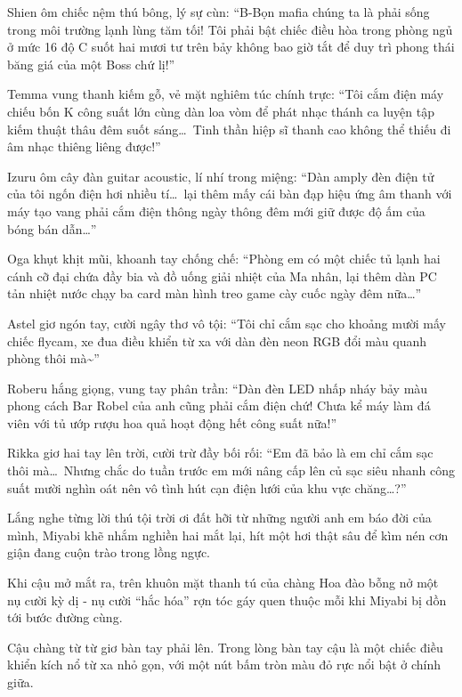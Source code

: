 \documentclass[../main.tex]{subfiles}
\begin{document}
Shien ôm chiếc nệm thú bông, lý sự cùn: ``B-Bọn mafia chúng ta là phải sống trong môi trường lạnh lùng tăm tối! Tôi phải bật chiếc điều hòa trong phòng ngủ ở mức 16 độ C suốt hai mươi tư trên bảy không bao giờ tắt để duy trì phong thái băng giá của một Boss chứ lị!''

Temma vung thanh kiếm gỗ, vẻ mặt nghiêm túc chính trực: ``Tôi cắm điện máy chiếu bốn K công suất lớn cùng dàn loa vòm để phát nhạc thánh ca luyện tập kiếm thuật thâu đêm suốt sáng\dots\ Tinh thần hiệp sĩ thanh cao không thể thiếu đi âm nhạc thiêng liêng được!''

Izuru ôm cây đàn guitar acoustic, lí nhí trong miệng: ``Dàn amply đèn điện tử của tôi ngốn điện hơi nhiều tí\dots\ lại thêm mấy cái bàn đạp hiệu ứng âm thanh với máy tạo vang phải cắm điện thông ngày thông đêm mới giữ được độ ấm của bóng bán dẫn\dots''

Oga khụt khịt mũi, khoanh tay chống chế: ``Phòng em có một chiếc tủ lạnh hai cánh cỡ đại chứa đầy bia và đồ uống giải nhiệt của Ma nhân, lại thêm dàn PC tản nhiệt nước chạy ba card màn hình treo game cày cuốc ngày đêm nữa\dots''

Astel giơ ngón tay, cười ngây thơ vô tội: ``Tôi chỉ cắm sạc cho khoảng mười mấy chiếc flycam, xe đua điều khiển từ xa với dàn đèn neon RGB đổi màu quanh phòng thôi mà\~{}''

Roberu hắng giọng, vung tay phân trần: ``Dàn đèn LED nhấp nháy bảy màu phong cách Bar Robel của anh cũng phải cắm điện chứ! Chưa kể máy làm đá viên với tủ ướp rượu hoa quả hoạt động hết công suất nữa!''

Rikka giơ hai tay lên trời, cười trừ đầy bối rối: ``Em đã bảo là em chỉ cắm sạc thôi mà\dots\ Nhưng chắc do tuần trước em mới nâng cấp lên củ sạc siêu nhanh công suất mười nghìn oát nên vô tình hút cạn điện lưới của khu vực chăng\dots?''

Lắng nghe từng lời thú tội trời ơi đất hỡi từ những người anh em báo đời của mình, Miyabi khẽ nhắm nghiền hai mắt lại, hít một hơi thật sâu để kìm nén cơn giận đang cuộn trào trong lồng ngực.

Khi cậu mở mắt ra, trên khuôn mặt thanh tú của chàng Hoa đào bỗng nở một nụ cười kỳ dị - nụ cười ``hắc hóa'' rợn tóc gáy quen thuộc mỗi khi Miyabi bị dồn tới bước đường cùng.

Cậu chàng từ từ giơ bàn tay phải lên. Trong lòng bàn tay cậu là một chiếc điều khiển kích nổ từ xa nhỏ gọn, với một nút bấm tròn màu đỏ rực nổi bật ở chính giữa.

\end{document}
